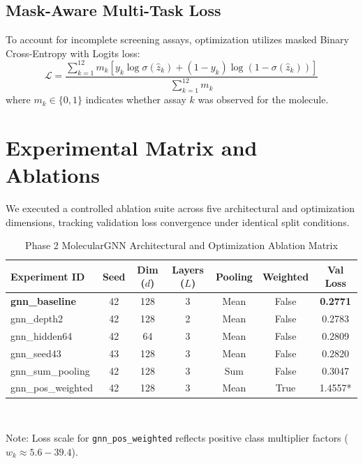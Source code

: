 \documentclass[conference]{IEEEtran}
\begin{document}
\subsection{Mask-Aware Multi-Task Loss}
To account for incomplete screening assays, optimization utilizes masked Binary Cross-Entropy with Logits loss:
\begin{equation}
    \mathcal{L} = \frac{\sum_{k=1}^{12} m_k \left[ y_k \log \sigma(\hat{z}_k) + (1 - y_k) \log (1 - \sigma(\hat{z}_k)) \right]}{\sum_{k=1}^{12} m_k}
\end{equation}
where $m_k \in \{0, 1\}$ indicates whether assay $k$ was observed for the molecule.

\section{Experimental Matrix and Ablations}
We executed a controlled ablation suite across five architectural and optimization dimensions, tracking validation loss convergence under identical split conditions.

\begin{table}[t]
\caption{Phase 2 MolecularGNN Architectural and Optimization Ablation Matrix}
\label{tab:ablations}
\centering
\begin{tabular}{lcccccc}
\toprule
\textbf{Experiment ID} & \textbf{Seed} & \textbf{Dim ($d$)} & \textbf{Layers ($L$)} & \textbf{Pooling} & \textbf{Weighted} & \textbf{Val Loss} \\
\midrule
\textbf{gnn\_baseline}   & 42 & 128 & 3 & Mean & False & \textbf{0.2771} \\
gnn\_depth2              & 42 & 128 & 2 & Mean & False & 0.2783 \\
gnn\_hidden64            & 42 &  64 & 3 & Mean & False & 0.2809 \\
gnn\_seed43              & 43 & 128 & 3 & Mean & False & 0.2820 \\
gnn\_sum\_pooling        & 42 & 128 & 3 & Sum  & False & 0.3047 \\
gnn\_pos\_weighted       & 42 & 128 & 3 & Mean & True  & 1.4557* \\
\bottomrule
\end{tabular}
\vspace{1ex}\\
\raggedright \footnotesize *Note: Loss scale for \texttt{gnn\_pos\_weighted} reflects positive class multiplier factors ($w_k \approx 5.6 - 39.4$).
\end{table}
\end{document}
